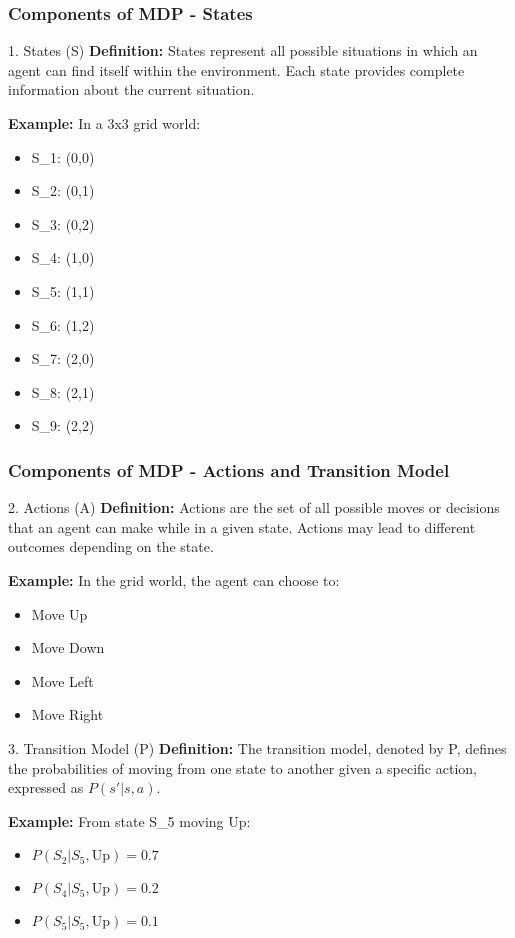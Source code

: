 \documentclass[aspectratio=169]{beamer}
\begin{document}
\begin{frame}[fragile]
    \frametitle{Components of MDP - States}
    \begin{block}{1. States (S)}
        \textbf{Definition:} States represent all possible situations in which an agent can find itself within the environment. Each state provides complete information about the current situation.
    \end{block}
    
    \textbf{Example:} In a 3x3 grid world:
    \begin{itemize}
        \item S\_1: (0,0)
        \item S\_2: (0,1)
        \item S\_3: (0,2)
        \item S\_4: (1,0)
        \item S\_5: (1,1)
        \item S\_6: (1,2)
        \item S\_7: (2,0)
        \item S\_8: (2,1)
        \item S\_9: (2,2)
    \end{itemize}
\end{frame}

\begin{frame}[fragile]
    \frametitle{Components of MDP - Actions and Transition Model}
    \begin{block}{2. Actions (A)}
        \textbf{Definition:} Actions are the set of all possible moves or decisions that an agent can make while in a given state. Actions may lead to different outcomes depending on the state.
    \end{block}
    
    \textbf{Example:} In the grid world, the agent can choose to:
    \begin{itemize}
        \item Move Up
        \item Move Down
        \item Move Left
        \item Move Right
    \end{itemize}
    
    \begin{block}{3. Transition Model (P)}
        \textbf{Definition:} The transition model, denoted by P, defines the probabilities of moving from one state to another given a specific action, expressed as \( P(s' | s, a) \).
    \end{block}
    
    \textbf{Example:} From state S\_5 moving Up:
    \begin{itemize}
        \item \( P(S_2 | S_5, \text{Up}) = 0.7 \)
        \item \( P(S_4 | S_5, \text{Up}) = 0.2 \)
        \item \( P(S_5 | S_5, \text{Up}) = 0.1 \)
    \end{itemize}
\end{frame}
\end{document}
